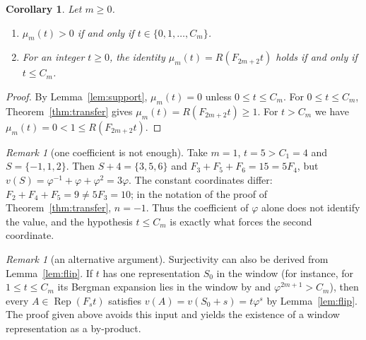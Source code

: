 \documentclass[11pt]{amsart}
\newtheorem{corollary}[theorem]{Corollary}
\theoremstyle{definition}
\theoremstyle{remark}
\newtheorem{remark}[theorem]{Remark}
\numberwithin{equation}{section}
\newcommand{\val}{v}
\newcommand{\Rep}{\operatorname{Rep}}
\begin{document}
\begin{corollary}\label{cor:support}
Let $m\ge0$.
\begin{enumerate}
\item[(a)] $\mu_m(t)>0$ if and only if $t\in\{0,1,\dots,C_m\}$.
\item[(b)] For an integer $t\ge0$, the identity $\mu_m(t)=R(F_{2m+2}t)$ holds if and only if
$t\le C_m$.
\end{enumerate}
\end{corollary}

\begin{proof}
By Lemma~\ref{lem:support}, $\mu_m(t)=0$ unless $0\le t\le C_m$. For $0\le t\le C_m$,
Theorem~\ref{thm:transfer} gives $\mu_m(t)=R(F_{2m+2}t)\ge1$. For $t>C_m$ we have $\mu_m(t)=0<1\le
R(F_{2m+2}t)$.
\end{proof}

\begin{remark}[one coefficient is not enough]\label{rem:onecoef}
Take $m=1$, $t=5>C_1=4$ and $S=\{-1,1,2\}$. Then $S+4=\{3,5,6\}$ and $F_3+F_5+F_6=15=5F_4$, but
$\val(S)=\varphi^{-1}+\varphi+\varphi^2=3\varphi$. The constant coordinates differ:
$F_2+F_4+F_5=9\neq 5F_3=10$; in the notation of the proof of Theorem~\ref{thm:transfer}, $n=-1$.
Thus the coefficient of $\varphi$ alone does not identify the value, and the hypothesis
$t\le C_m$ is exactly what forces the second coordinate.
\end{remark}

\begin{remark}[an alternative argument]\label{rem:altproof}
Surjectivity can also be derived from Lemma~\ref{lem:flip}. If $t$ has one representation $S_0$ in
the window (for instance, for $1\le t\le C_m$ its Bergman expansion lies in the window by
\cite[Proposition~5.1(b)]{DekkingVanLoon2024} and $\varphi^{2m+1}>C_m$), then every $A\in\Rep(F_st)$
satisfies $\val(A)=\val(S_0+s)=t\varphi^s$ by Lemma~\ref{lem:flip}. The proof given above avoids
this input and yields the existence of a window representation as a by-product.
\end{remark}
\end{document}
